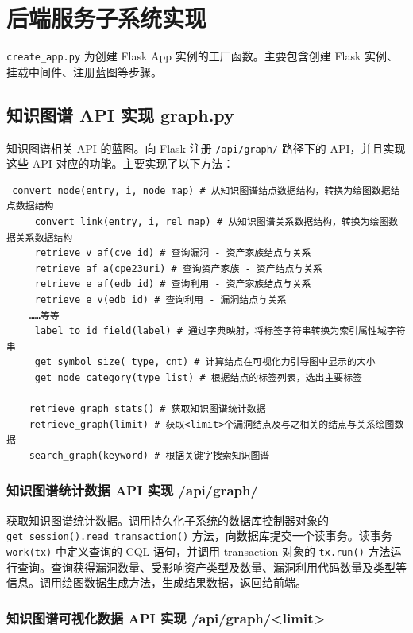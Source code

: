 \documentclass[a4paper,AutoFakeBold,oneside,12pt]{book}
\begin{document}
\section{后端服务子系统实现}

\lstinline|create_app.py| 为创建 Flask App 实例的工厂函数\cite{factory_method_design_pattern}。主要包含创建 Flask 实例、挂载中间件、注册蓝图等步骤。

\subsection{知识图谱 API 实现 graph.py}

知识图谱相关 API 的蓝图。向 Flask 注册 \lstinline|/api/graph/| 路径下的 API，并且实现这些 API 对应的功能。主要实现了以下方法：
\begin{lstlisting}[style=lgeneral]
	_convert_node(entry, i, node_map) # 从知识图谱结点数据结构，转换为绘图数据结点数据结构
	_convert_link(entry, i, rel_map) # 从知识图谱关系数据结构，转换为绘图数据关系数据结构
	_retrieve_v_af(cve_id) # 查询漏洞 - 资产家族结点与关系
	_retrieve_af_a(cpe23uri) # 查询资产家族 - 资产结点与关系
	_retrieve_e_af(edb_id) # 查询利用 - 资产家族结点与关系
	_retrieve_e_v(edb_id) # 查询利用 - 漏洞结点与关系
	……等等
	_label_to_id_field(label) # 通过字典映射，将标签字符串转换为索引属性域字符串
	_get_symbol_size(_type, cnt) # 计算结点在可视化力引导图中显示的大小
	_get_node_category(type_list) # 根据结点的标签列表，选出主要标签

	retrieve_graph_stats() # 获取知识图谱统计数据
	retrieve_graph(limit) # 获取<limit>个漏洞结点及与之相关的结点与关系绘图数据
	search_graph(keyword) # 根据关键字搜索知识图谱
\end{lstlisting}

\subsubsection{知识图谱统计数据 API 实现 /api/graph/}

获取知识图谱统计数据。调用持久化子系统的数据库控制器对象的 \lstinline|get_session().read_transaction()| 方法，向数据库提交一个读事务。读事务 \lstinline|work(tx)| 中定义查询的 CQL 语句，并调用 transaction 对象的 \lstinline|tx.run()| 方法运行查询。查询获得漏洞数量、受影响资产类型及数量、漏洞利用代码数量及类型等信息。调用绘图数据生成方法，生成结果数据，返回给前端。

\subsubsection{知识图谱可视化数据 API 实现 /api/graph/<limit>\label{subsubsec:/api/graph/limit}}
\end{document}
